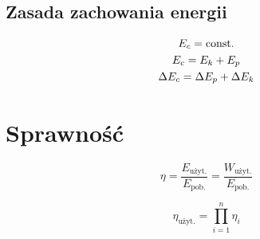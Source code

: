 \subsection{Zasada zachowania energii}
\begin{gather*}
  E_c = \operatorname{const.}\\
  E_c = E_k + E_p\\
  \Delta E_c = \Delta E_p + \Delta E_k
\end{gather*}

\section{Sprawność}
\begin{equation}
  \eta = \frac{E_\text{użyt.}}{E_\text{pob.}} = \frac{W_\text{użyt.}}{E_\text{pob.}}
\end{equation}

\begin{equation*}
  \eta_\text{użyt.} = \prod_{i=1}^n \eta_i
\end{equation*}

